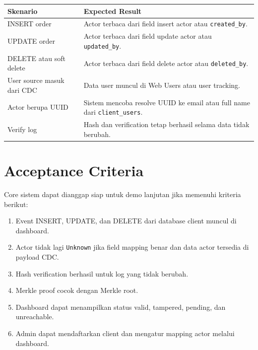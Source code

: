 \begin{longtable}{p{4cm}p{9cm}}
\toprule
\textbf{Skenario} & \textbf{Expected Result} \\
\midrule
INSERT order & Actor terbaca dari field insert actor atau \texttt{created\_by}. \\
\midrule
UPDATE order & Actor terbaca dari field update actor atau \texttt{updated\_by}. \\
\midrule
DELETE atau soft delete & Actor terbaca dari field delete actor atau \texttt{deleted\_by}. \\
\midrule
User source masuk dari CDC & Data user muncul di Web Users atau user tracking. \\
\midrule
Actor berupa UUID & Sistem mencoba resolve UUID ke email atau full name dari \texttt{client\_users}. \\
\midrule
Verify log & Hash dan verification tetap berhasil selama data tidak berubah. \\
\bottomrule
\end{longtable}

\section{Acceptance Criteria}

Core sistem dapat dianggap siap untuk demo lanjutan jika memenuhi kriteria berikut:

\begin{enumerate}
    \item Event INSERT, UPDATE, dan DELETE dari database client muncul di dashboard.
    \item Actor tidak lagi \texttt{Unknown} jika field mapping benar dan data actor tersedia di payload CDC.
    \item Hash verification berhasil untuk log yang tidak berubah.
    \item Merkle proof cocok dengan Merkle root.
    \item Dashboard dapat menampilkan status valid, tampered, pending, dan unreachable.
    \item Admin dapat mendaftarkan client dan mengatur mapping actor melalui dashboard.
\end{enumerate}
